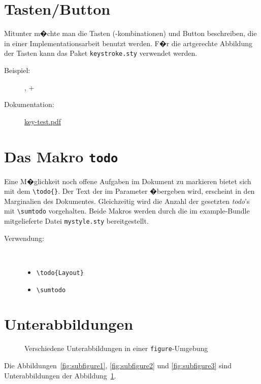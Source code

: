 \section{Tasten/Button}
\label{sec:tasten}

Mitunter m�chte man die Tasten (-kombinationen) und Button beschreiben, die in
einer Implementationsarbeit benutzt werden. F�r die artgerechte Abbildung der
Tasten kann das Paket \lstinline!keystroke.sty! verwendet werden.

\begin{description}
\item[Beispiel:] , \Ctrl+
\item[Dokumentation:]
  \href{ftp://ftp.dante.de/tex-archive/macros/latex/contrib/keystroke/key-test.pdf}{key-test.pdf}

\end{description}


\section{Das Makro \texttt{todo}}
\label{sec:todo}

Eine M�glichkeit noch offene Aufgaben im Dokument zu markieren bietet sich mit
dem \lstinline!\todo{}!. Der Text der im Parameter �bergeben wird, erscheint
in den Marginalien des Dokumentes. Gleichzeitig wird die Anzahl der gesetzten
\emph{todo}'s mit \lstinline!\sumtodo! vorgehalten. Beide Makros werden durch
die im example-Bundle mitgelieferte Datei \lstinline!mystyle.sty!
bereitgestellt.

\begin{description}
\item[Verwendung:] \
  \begin{itemize}
  \item \lstinline!\todo{Layout}!
  \item \lstinline!\sumtodo!
  \end{itemize}
\end{description}
\sumtodo



\section{Unterabbildungen}
\label{sec:subfigure}

\begin{figure}[H]
  \centering
  \subfigure[Gro�]{\label{fig:subfigure1}\texttt{[image: ex1]}}\quad%
  \subfigure[Mittel]{\label{fig:subfigure2}\texttt{[image: ex1]}}\quad%
  \subfigure[Klein]{\label{fig:subfigure3}\texttt{[image: ex1]}}\quad
  \caption{Verschiedene Unterabbildungen in einer \texttt{figure}-Umgebung}
  \label{fig:subfigure}
\end{figure}

Die Abbildungen~\ref{fig:subfigure1}, \ref{fig:subfigure2} und
\ref{fig:subfigure3} sind Unterabbildungen der Abbildung~\ref{fig:subfigure}.



